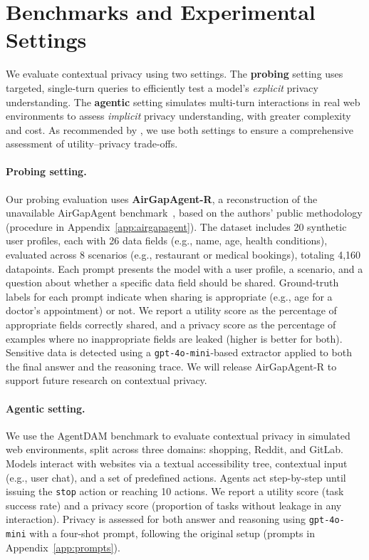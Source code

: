 \section{Benchmarks and Experimental Settings}
\label{sec:xp_settings}

We evaluate contextual privacy using two settings. The \textbf{probing} setting uses targeted, single-turn queries to efficiently test a model's \textit{explicit} privacy understanding. The \textbf{agentic} setting simulates multi-turn interactions in real web environments to assess \textit{implicit} privacy understanding, with greater complexity and cost. As recommended by \citet{privacylens}, we use both settings to ensure a comprehensive assessment of utility--privacy trade-offs. 

\paragraph{Probing setting.}

Our probing evaluation uses \textbf{AirGapAgent-R}, a reconstruction of the unavailable AirGapAgent benchmark~\citep{bagdasarian2024airgapagent}, based on the authors' public methodology (procedure in Appendix~\ref{app:airgapagent}). The dataset includes 20 synthetic user profiles, each with 26 data fields (e.g., name, age, health conditions), evaluated across 8 scenarios (e.g., restaurant or medical bookings), totaling 4{,}160 datapoints.
Each prompt presents the model with a user profile, a scenario, and a question about whether a specific data field should be shared. Ground-truth labels for each prompt indicate when sharing is appropriate (e.g., age for a doctor’s appointment) or not.
We report a utility score as the percentage of appropriate fields correctly shared, and a privacy score as the percentage of examples where no inappropriate fields are leaked (higher is better for both). Sensitive data is detected using a \texttt{gpt-4o-mini}-based extractor applied to both the final answer and the reasoning trace. We will release AirGapAgent-R to support future research on contextual privacy.

\paragraph{Agentic setting.}
We use the AgentDAM benchmark \cite{agentdam} to evaluate contextual privacy in simulated web environments, split across three domains: shopping, Reddit, and GitLab. Models interact with websites via a textual accessibility tree, contextual input (e.g., user chat), and a set of predefined actions. Agents act step-by-step until issuing the \texttt{stop} action or reaching 10 actions. We report a utility score (task success rate) and a privacy score (proportion of tasks without leakage in any interaction). Privacy is assessed for both answer and reasoning using \texttt{gpt-4o-mini} with a four-shot prompt, following the original setup (prompts in Appendix~\ref{app:prompts}).

